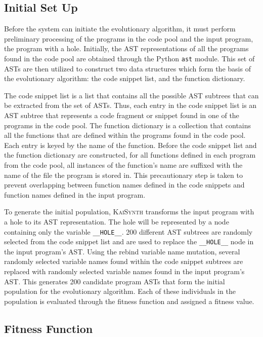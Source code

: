 \documentclass{article}
\begin{document}
\subsection{Initial Set Up}

Before the system can initiate the evolutionary algorithm, it must perform preliminary processing of the programs in the code pool and the input program, the program with a hole. Initially, the AST representations of all the programs found in the code pool are obtained through the Python \texttt{ast} module. This set of ASTs are then utilized to construct two data structures which form the basis of the evolutionary algorithm: the code snippet list, and the function dictionary.

The code snippet list is a list that contains all the possible AST subtrees that can be extracted from the set of ASTs. Thus, each entry in the code snippet list is an AST subtree that represents a code fragment or snippet found in one of the programs in the code pool. The function dictionary is a collection that contains all the functions that are defined within the programs found in the code pool. Each entry is keyed by the name of the function. Before the code snippet list and the function dictionary are constructed, for all functions defined in each program from the code pool, all instances of the function's name are suffixed with the name of the file the program is stored in. This precautionary step is taken to prevent overlapping between function names defined in the code snippets and function names defined in the input program.

To generate the initial population, \textsc{KaiSynth} transforms the input program with a hole to its AST representation. The hole will be represented by a node containing only the variable \texttt{\_\_HOLE\_\_}. 200 different AST subtrees are randomly selected from the code snippet list and are used to replace the \texttt{\_\_HOLE\_\_} node in the input program's AST. Using the rebind variable name mutation, several randomly selected variable names found within the code snippet subtrees are replaced with randomly selected variable names found in the input program's AST. This generates 200 candidate program ASTs that form the initial population for the evolutionary algorithm. Each of these individuals in the population is evaluated through the fitness function and assigned a fitness value.

\subsection{Fitness Function}
\end{document}
